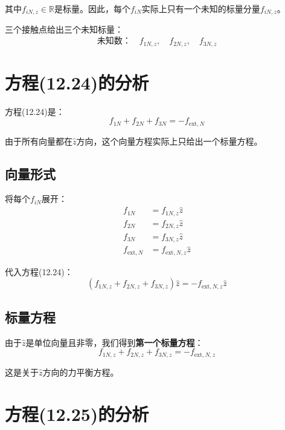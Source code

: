 \documentclass[12pt,a4paper]{article}
\begin{document}
其中$f_{iN,z} \in \mathbb{R}$是标量。因此，每个$f_{iN}$实际上只有一个未知的标量分量$f_{iN,z}$。

三个接触点给出三个未知标量：
\begin{equation}
\text{未知数：} \quad f_{1N,z}, \quad f_{2N,z}, \quad f_{3N,z}
\end{equation}

\section{方程(12.24)的分析}

方程(12.24)是：
\begin{equation}
f_{1N} + f_{2N} + f_{3N} = -f_{\text{ext},N} \label{eq:12.24}
\end{equation}

由于所有向量都在$\hat{z}$方向，这个向量方程实际上只给出一个标量方程。

\subsection{向量形式}

将每个$f_{iN}$展开：
\begin{align}
f_{1N} &= f_{1N,z} \hat{z} \\
f_{2N} &= f_{2N,z} \hat{z} \\
f_{3N} &= f_{3N,z} \hat{z} \\
f_{\text{ext},N} &= f_{\text{ext},N,z} \hat{z}
\end{align}

代入方程(12.24)：
\begin{equation}
(f_{1N,z} + f_{2N,z} + f_{3N,z}) \hat{z} = -f_{\text{ext},N,z} \hat{z}
\end{equation}

\subsection{标量方程}

由于$\hat{z}$是单位向量且非零，我们得到\textbf{第一个标量方程}：
\begin{equation}
f_{1N,z} + f_{2N,z} + f_{3N,z} = -f_{\text{ext},N,z} \label{eq:scalar1}
\end{equation}

这是关于$\hat{z}$方向的力平衡方程。

\section{方程(12.25)的分析}
\end{document}
